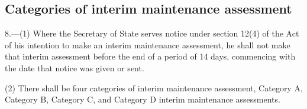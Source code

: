 \documentclass[a4paper,12pt]{article}
\begin{document}
%
%
%

\subsection[8. Categories of interim maintenance assessment]{Categories of interim maintenance assessment}

8.—(1) Where 
the Secretary of State  %
serves notice under section 12(4) of the Act of his intention to make an interim maintenance assessment, he shall not make that interim assessment before the end of a period of 14 days, commencing with the date that notice was given or sent.

(2) There shall be four categories of interim maintenance assessment, Category A, Category B, Category C, and Category D interim maintenance assessments.
\end{document}
